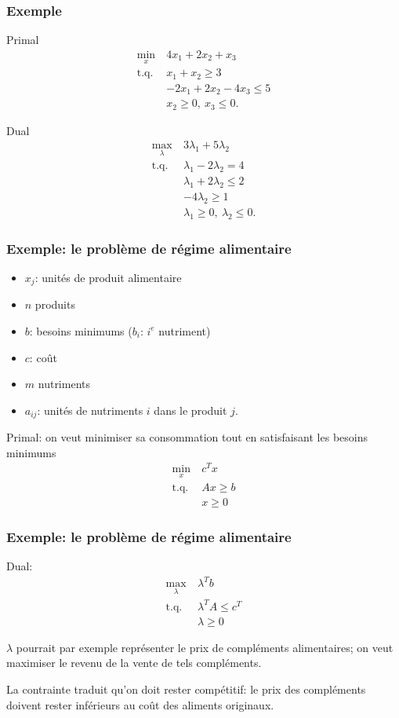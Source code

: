 \documentclass[usepdftitle=false]{beamer}
\begin{document}
\begin{frame}
	\frametitle{Exemple}
	
	Primal
	\begin{align*}
		\min_x\ & 4x_1 + 2x_2 + x_3 \\
		\text{t.q. } & x_1 + x_2 \geq 3 \\
		& -2x_1 + 2x_2 -4 x_3 \leq 5 \\
		& x_2 \geq 0,\ x_3 \leq 0.
	\end{align*}
	
	Dual
	\begin{align*}
		\max_{\lambda}\ & 3\lambda_1 + 5\lambda_2 \\
		\text{t.q. } & \lambda_1 -2\lambda_2 = 4 \\
		& \lambda_1 +2\lambda_2 \leq 2 \\
		& -4\lambda_2 \geq 1 \\
		& \lambda_1 \geq 0,\ \lambda_2 \leq 0.
	\end{align*}
	
\end{frame}

\begin{frame}
\frametitle{Exemple: le problème de régime alimentaire}

\begin{itemize}
\item
$x_j$: unités de produit alimentaire
\item
$n$ produits
\item
$b$: besoins minimums ($b_i$: $i^e$ nutriment)
\item
$c$: coût
\item
$m$ nutriments
\item
$a_{ij}$: unités de nutriments $i$ dans le produit $j$.
\end{itemize}

Primal: on veut minimiser sa consommation tout en satisfaisant les besoins minimums
\begin{align*}
\min_x \ & c^T x \\
\mbox{t.q. } & Ax \geq b \\
& x \geq 0
\end{align*}

\end{frame}

\begin{frame}
\frametitle{Exemple: le problème de régime alimentaire}

Dual:
\begin{align*}
\max_{\lambda} \ & \lambda^T b \\
\mbox{t.q. } & \lambda^T A \leq c^T \\
& \lambda \geq 0
\end{align*}

$\lambda$ pourrait par exemple représenter le prix de compléments alimentaires; on veut maximiser le revenu de la vente de tels compléments.

\mbox{}

La contrainte traduit qu'on doit rester compétitif: le prix des compléments doivent rester inférieurs au coût des aliments originaux.

\end{frame}
\end{document}
